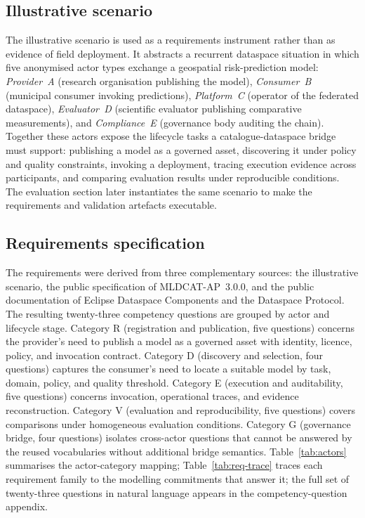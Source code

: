 \documentclass[11pt,a4paper]{article}
\begin{document}
\subsection{Illustrative scenario}\label{sec:scenario}

The illustrative scenario is used as a requirements instrument rather than as evidence of field deployment. It abstracts a recurrent dataspace situation in which five anonymised actor types exchange a geospatial risk-prediction model: \emph{Provider~A} (research organisation publishing the model), \emph{Consumer~B} (municipal consumer invoking predictions), \emph{Platform~C} (operator of the federated dataspace), \emph{Evaluator~D} (scientific evaluator publishing comparative measurements), and \emph{Compliance~E} (governance body auditing the chain). Together these actors expose the lifecycle tasks a catalogue-dataspace bridge must support: publishing a model as a governed asset, discovering it under policy and quality constraints, invoking a deployment, tracing execution evidence across participants, and comparing evaluation results under reproducible conditions. The evaluation section later instantiates the same scenario to make the requirements and validation artefacts executable.

\subsection{Requirements specification}\label{sec:method-req}

The requirements were derived from three complementary sources: the illustrative scenario, the public specification of MLDCAT-AP~3.0.0, and the public documentation of Eclipse Dataspace Components and the Dataspace Protocol. The resulting twenty-three competency questions are grouped by actor and lifecycle stage. Category R (registration and publication, five questions) concerns the provider's need to publish a model as a governed asset with identity, licence, policy, and invocation contract. Category D (discovery and selection, four questions) captures the consumer's need to locate a suitable model by task, domain, policy, and quality threshold. Category E (execution and auditability, five questions) concerns invocation, operational traces, and evidence reconstruction. Category V (evaluation and reproducibility, five questions) covers comparisons under homogeneous evaluation conditions. Category G (governance bridge, four questions) isolates cross-actor questions that cannot be answered by the reused vocabularies without additional bridge semantics. Table~\ref{tab:actors} summarises the actor-category mapping; Table~\ref{tab:req-trace} traces each requirement family to the modelling commitments that answer it; the full set of twenty-three questions in natural language appears in the competency-question appendix.
\end{document}
